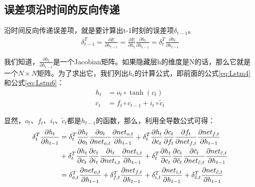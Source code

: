 \subsection{误差项沿时间的反向传递}\label{Lstm:6}

沿时间反向传递误差项，就是要计算出t-1时刻的误差项\(\delta_{t-1}\)。
\begin{align*}
	\delta_{t-1}^T=\frac{\partial{E}}{\partial{{h_{t-1}}}}=\frac{\partial{E}}{\partial{{h_t}}}\frac{\partial{{h_t}}}{\partial{{h_{t-1}}}}=\delta_{t}^T\frac{\partial{{h_t}}}{\partial{{h_{t-1}}}}
\end{align*}

我们知道，\(\frac{\partial{{h_t}}}{\partial{{h_{t-1}}}}\)是一个Jacobian矩阵。如果隐藏层h的维度是N的话，那么它就是一个\(N\times N\)矩阵。为了求出它，我们列出\({h}_t\)的计算公式，即前面的公式\ref{eq:Lstm4}和公式\ref{eq:Lstm6}：
\begin{align*}
	{h}_t & ={o}_t\circ \tanh({c}_t)                     \\
	{c}_t & ={f}_t\circ{c}_{t-1}+{i}_t\circ{\tilde{c}}_t
\end{align*}

显然，\({o}_t\)、\({f}_t\)、\({i}_t\)、\({\tilde{c}}_t\)都是\({h}_{t-1}\)的函数，那么，利用全导数公式可得：
\begin{align}
	\delta_t^T\frac{\partial{{h_t}}}{\partial{{h_{t-1}}}} & =\delta_t^T\frac{\partial{{h_t}}}{\partial{{o}_t}}\frac{\partial{{o}_t}}{\partial{{net}_{o,t}}}\frac{\partial{{net}_{o,t}}}{\partial{{h_{t-1}}}}
	+\delta_t^T\frac{\partial{{h_t}}}{\partial{{c}_t}}\frac{\partial{{c}_t}}{\partial{{f_{t}}}}\frac{\partial{{f}_t}}{\partial{{net}_{f,t}}}\frac{\partial{{net}_{f,t}}}{\partial{{h_{t-1}}}}\notag                                                   \\
	                                                      & +\delta_t^T\frac{\partial{{h_t}}}{\partial{{c}_t}}\frac{\partial{{c}_t}}{\partial{{i_{t}}}}\frac{\partial{{i}_t}}{\partial{{net}_{i,t}}}\frac{\partial{{net}_{i,t}}}{\partial{{h_{t-1}}}}
	+\delta_t^T\frac{\partial{{h_t}}}{\partial{{c}_t}}\frac{\partial{{c}_t}}{\partial{{\tilde{c}}_{t}}}\frac{\partial{{\tilde{c}}_t}}{\partial{{net}_{\tilde{c},t}}}\frac{\partial{{net}_{\tilde{c},t}}}{\partial{{h_{t-1}}}}\notag                   \\
	                                                      & =\delta_{o,t}^T\frac{\partial{{net}_{o,t}}}{\partial{{h_{t-1}}}}
	+\delta_{f,t}^T\frac{\partial{{net}_{f,t}}}{\partial{{h_{t-1}}}}
	+\delta_{i,t}^T\frac{\partial{{net}_{i,t}}}{\partial{{h_{t-1}}}}
	+\delta_{\tilde{c},t}^T\frac{\partial{{net}_{\tilde{c},t}}}{\partial{{h_{t-1}}}}\label{eq:Lstm7}
\end{align}


